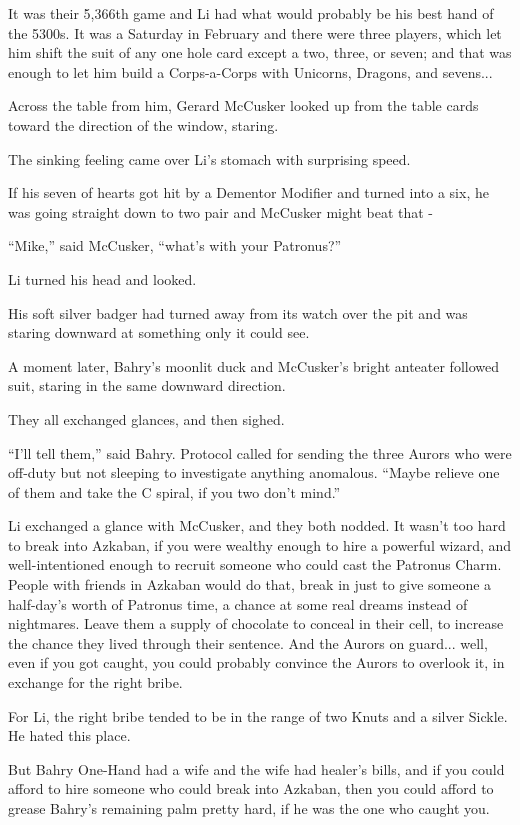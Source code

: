 It was their 5,366th game and Li had what would probably be his best
hand of the 5300s. It was a Saturday in February and there were three
players, which let him shift the suit of any one hole card except a two,
three, or seven; and that was enough to let him build a Corps-a-Corps
with Unicorns, Dragons, and sevens...

Across the table from him, Gerard McCusker looked up from the table
cards toward the direction of the window, staring.

The sinking feeling came over Li's stomach with surprising speed.

If his seven of hearts got hit by a Dementor Modifier and turned into a
six, he was going straight down to two pair and McCusker might beat that
-

``Mike,'' said McCusker, ``what's with your Patronus?''

Li turned his head and looked.

His soft silver badger had turned away from its watch over the pit and
was staring downward at something only it could see.

A moment later, Bahry's moonlit duck and McCusker's bright anteater
followed suit, staring in the same downward direction.

They all exchanged glances, and then sighed.

``I'll tell them,'' said Bahry. Protocol called for sending the three
Aurors who were off-duty but not sleeping to investigate anything
anomalous. ``Maybe relieve one of them and take the C spiral, if you two
don't mind.''

Li exchanged a glance with McCusker, and they both nodded. It wasn't too
hard to break into Azkaban, if you were wealthy enough to hire a
powerful wizard, and well-intentioned enough to recruit someone who
could cast the Patronus Charm. People with friends in Azkaban would do
that, break in just to give someone a half-day's worth of Patronus time,
a chance at some real dreams instead of nightmares. Leave them a supply
of chocolate to conceal in their cell, to increase the chance they lived
through their sentence. And the Aurors on guard... well, even if
you got caught, you could probably convince the Aurors to overlook it,
in exchange for the right bribe.

For Li, the right bribe tended to be in the range of two Knuts and a
silver Sickle. He hated this place.

But Bahry One-Hand had a wife and the wife had healer's bills, and if
you could afford to hire someone who could break into Azkaban, then you
could afford to grease Bahry's remaining palm pretty hard, if he was the
one who caught you.

